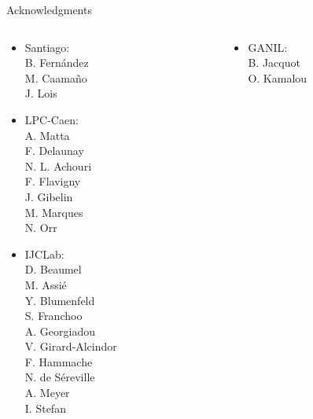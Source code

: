 \documentclass[aspectratio=43, dvipsnames]{beamer}
\begin{document}
\begin{frame}[plain]{Acknowledgments}
    \begin{columns}[T]
        \begin{column}{0.33\linewidth}
            \begin{itemize}\scriptsize
                \item Santiago:\\
                      B. Fernández\\
                      M. Caamaño\\
                      J. Lois
                \item LPC-Caen:\\
                      A. Matta\\
                      F. Delaunay\\
                      N. L. Achouri\\
                      F. Flavigny\\
                      J. Gibelin\\
                      M. Marques\\
                      N. Orr
                \item IJCLab:\\
                      D. Beaumel\\
                      M. Assié\\
                      Y. Blumenfeld\\
                      S. Franchoo\\
                      A. Georgiadou\\
                      V. Girard-Alcindor\\
                      F. Hammache\\
                      N. de Séreville\\
                      A. Meyer\\
                      I. Stefan
            \end{itemize}
        \end{column}
        \begin{column}{0.33\linewidth}
            \begin{itemize}\scriptsize
                \item GANIL:\\
                      B. Jacquot\\
                      O. Kamalou\\

\end{itemize}
\end{column}
\end{columns}
\end{frame}
\end{document}
